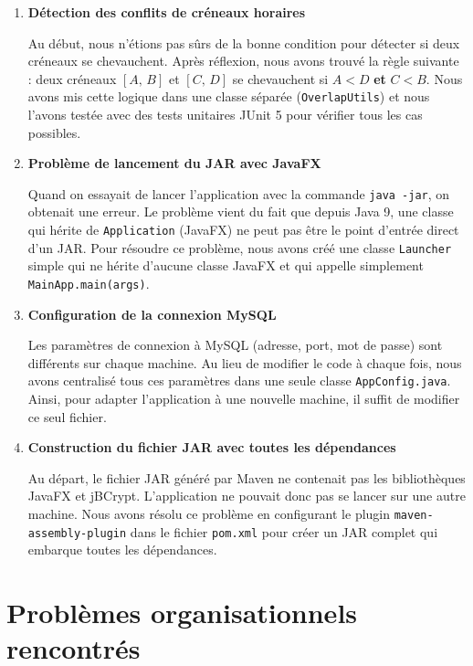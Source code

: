 \documentclass[12pt, a4paper]{report}
\begin{document}
\begin{enumerate}

  \item \textbf{Détection des conflits de créneaux horaires}

  Au début, nous n'étions pas sûrs de la bonne condition pour détecter
  si deux créneaux se chevauchent. Après réflexion, nous avons trouvé
  la règle suivante : deux créneaux $[A,\,B]$ et $[C,\,D]$ se chevauchent
  si $A < D$ \textbf{et} $C < B$. Nous avons mis cette logique dans une
  classe séparée (\texttt{OverlapUtils}) et nous l'avons testée avec des
  tests unitaires JUnit 5 pour vérifier tous les cas possibles.

  \item \textbf{Problème de lancement du JAR avec JavaFX}

  Quand on essayait de lancer l'application avec la commande
  \texttt{java -jar}, on obtenait une erreur. Le problème vient du fait
  que depuis Java 9, une classe qui hérite de \texttt{Application} (JavaFX)
  ne peut pas être le point d'entrée direct d'un JAR. Pour résoudre ce
  problème, nous avons créé une classe \texttt{Launcher} simple qui ne
  hérite d'aucune classe JavaFX et qui appelle simplement
  \texttt{MainApp.main(args)}.

  \item \textbf{Configuration de la connexion MySQL}

  Les paramètres de connexion à MySQL (adresse, port, mot de passe) sont
  différents sur chaque machine. Au lieu de modifier le code à chaque fois,
  nous avons centralisé tous ces paramètres dans une seule classe
  \texttt{AppConfig.java}. Ainsi, pour adapter l'application à une nouvelle
  machine, il suffit de modifier ce seul fichier.

  \item \textbf{Construction du fichier JAR avec toutes les dépendances}

  Au départ, le fichier JAR généré par Maven ne contenait pas les bibliothèques
  JavaFX et jBCrypt. L'application ne pouvait donc pas se lancer sur une autre
  machine. Nous avons résolu ce problème en configurant le plugin
  \texttt{maven-assembly-plugin} dans le fichier \texttt{pom.xml} pour créer
  un JAR complet qui embarque toutes les dépendances.

\end{enumerate}

\section{Problèmes organisationnels rencontrés}
\end{document}
